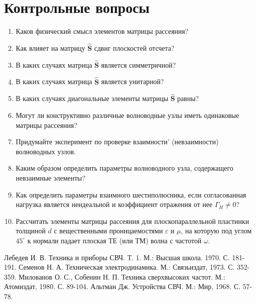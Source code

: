 ﻿\documentclass[a4paper,11pt]{article}
\begin{document}
\section{Контрольные вопросы}

\begin{enumerate}
	\item  Каков физический смысл элементов матрицы рассеяния?
	\item Как влияет на матрицу $\hat{\mathbf{S}}$ сдвиг плоскостей отсчета?
	\item В каких случаях матрица $\hat{\mathbf{S}}$ является симметричной?
	\item В каких случаях матрица $\hat{\mathbf{S}}$ является унитарной?
	\item В каких случаях диагональные элементы матрицы $\hat{\mathbf{S}}$ равны?
	\item Могут ли конструктивно различные волноводные узлы иметь одинаковые матрицы рассеяния?
	\item Придумайте эксперимент по проверке взаимности' (невзаимности) волноводных узлов.
	\item Каким образом определить параметры волноводного узла, содержащего невзаимные элементы?
	\item Как определить параметры взаимного шестиполюсника, если согласованная нагрузка является неидеальной и коэффициент отражения от нее $\Gamma_H\ne 0$?
	\item Рассчитать элементы матрицы рассеяния для плоскопараллельной пластинки толщиной $d$ с вещественными проницаемостями $\varepsilon$ и $\mu$, на которую под углом $45^\circ$ к нормали падает плоская ТЕ (или ТМ) волна с частотой $\omega$.
\end{enumerate}


 
\begin{thebibliography}{}
      Лебедев И. В. Техника и приборы СВЧ. Т. 1. М.: Высшая школа. 1970. С. 181-191.
     Семенов Н. А. Техническая электродинамика. М.: Связьиздат, 1973. С. 352-359.
      Милованов О. С., Собенин Н. П. Техника сверхвысоких частот. М.: Атомиздат, 1980. С. 89-104.
     Альтман Дж. Устройства СВЧ. М.: Мир, 1968. С. 57-78.
\end{thebibliography}
\end{document}
